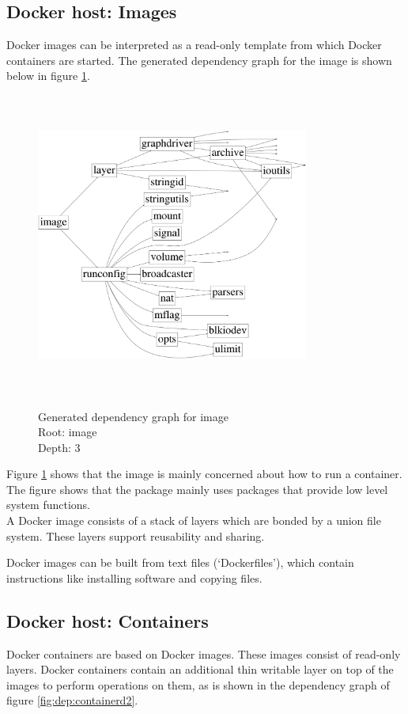 \subsection{Docker host: Images}

Docker images can be interpreted as a read-only template from which Docker containers are started. The generated dependency graph for the image is shown below in figure \ref{fig:dep:imaged3}.

\begin{figure}[H]
\caption{%
Generated dependency graph for image\\
Root: image\\
Depth: 3%
}
\centering
\includegraphics[width=0.8\textwidth, height=10cm]{images/dependencyGoviz/govizimageD-3-waybetter.png}
\label{fig:dep:imaged3}
\end{figure}

Figure \ref{fig:dep:imaged3} shows that the image is mainly concerned about how to run a container. The figure shows that the  package mainly uses packages that provide low level system functions.\\
A Docker image consists of a stack of layers which are bonded by a union file system. These layers support reusability and sharing.

Docker images can be built from text files (`Dockerfiles'), which contain instructions like installing software and copying files.

\subsection{Docker host: Containers}
\label{subsec:container}
Docker containers are based on Docker images. These images consist of read-only layers. Docker containers contain an additional thin writable layer on top of the images to
perform operations on them, as is shown in the dependency graph of figure \ref{fig:dep:containerd2}.

